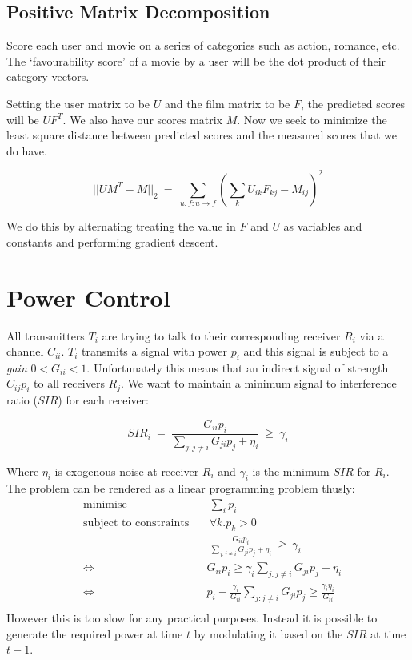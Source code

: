 \documentclass[a4paper]{article}
\begin{document}
\subsection{Positive Matrix Decomposition}

Score each user and movie on a series of categories such as action, romance, etc. The `favourability score' of a movie by a user will be the dot product of their category vectors.

Setting the user matrix to be $U$ and the film matrix to be $F$, the predicted scores will be $UF^T$. We also have our scores matrix $M$. Now we seek to minimize the least square distance between predicted scores and the measured scores that we do have.

$$||UM^T - M||_2\ =\ \sum\limits_{u,f:u\rightarrow f}(\sum\limits_k U_{ik}F_{kj} - M_{ij})^2$$

We do this by alternating treating the value in $F$ and $U$ as variables and constants and performing gradient descent.

\section{Power Control}

All transmitters $T_i$ are trying to talk to their corresponding receiver $R_i$ via a channel $C_{ii}$. $T_i$ transmits a signal with power $p_i$ and this signal is subject to a \textit{gain} $0<G_{ii}<1$. Unfortunately this means that an indirect signal of strength $C_{ij}p_i$ to all receivers $R_j$. We want to maintain a minimum signal to interference ratio ($SIR$) for each receiver:

$$SIR_i\ =\ \frac{G_{ii}p_i}{\sum\limits_{j:j\neq i}G_{ji}p_j + \eta_i}\ \geq\ \gamma_i $$

Where $\eta_i$ is exogenous noise at receiver $R_i$ and $\gamma_i$ is the minimum $SIR$ for $R_i$. The problem can be rendered as a linear programming problem thusly:
\begin{align*}
	&\text{minimise} &&\ \sum\limits_i p_i \\
	&\text{subject to constraints} &&\ \forall k.p_k > 0 \\
	& &&\ \frac{G_{ii}p_i}{\sum\limits_{j:j\neq i}G_{ji}p_j + \eta_i}\ \geq\ \gamma_i \\
	& \Leftrightarrow&&G_{ii}p_i\geq \gamma_i \sum\limits_{j:j\neq i}G_{ji}p_j + \eta_i \\
	& \Leftrightarrow&& p_i - \frac{\gamma_i}{G_{ii}}\sum\limits_{j:j\neq i}G_{ji}p_j \geq \frac{\gamma_i\eta_i}{G_{ii}} \\
\end{align*}
However this is too slow for any practical purposes.
Instead it is possible to generate the required power at time $t$ by modulating it based on the $SIR$ at time $t-1$.
\end{document}
